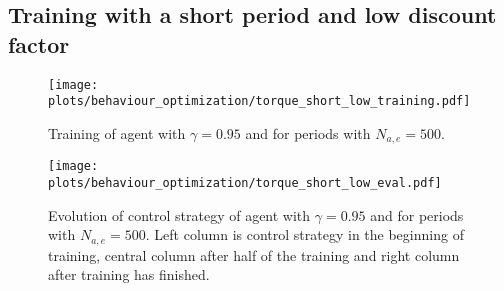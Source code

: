 \subsection{Training with a short period and low discount factor}
\begin{figure}[h]
	\centering
	\texttt{[image: plots/behaviour\_optimization/torque\_short\_low\_training.pdf]}
	\caption{ Training of agent with $\gamma=0.95$ and for periods with $N_{a,e}=500$.}
	\label{fig:torque_short_low_training}
\end{figure}
\begin{figure}[h]
	\centering
	\texttt{[image: plots/behaviour\_optimization/torque\_short\_low\_eval.pdf]}
	\caption{ Evolution of control strategy of agent with $\gamma=0.95$ and for periods with $N_{a,e}=500$. Left column is control strategy in the beginning of training, central column after half of the training and right column after training has finished.}
	\label{fig:torque_short_low_eval}
\end{figure}
